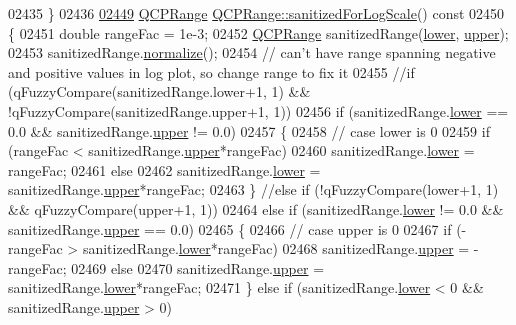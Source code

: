 \begin{DoxyCode}
02435 \}
02436 
\hypertarget{a00115_source_l02449}{}\hyperlink{a00049_aaf6a9046e78d91eeb8e89584fe46b034}{02449} \hyperlink{a00049}{QCPRange} \hyperlink{a00049_aaf6a9046e78d91eeb8e89584fe46b034}{QCPRange::sanitizedForLogScale}()\textcolor{keyword}{ const}
02450 \textcolor{keyword}{}\{
02451   \textcolor{keywordtype}{double} rangeFac = 1e-3;
02452   \hyperlink{a00049}{QCPRange} sanitizedRange(\hyperlink{a00049_aa3aca3edb14f7ca0c85d912647b91745}{lower}, \hyperlink{a00049_ae44eb3aafe1d0e2ed34b499b6d2e074f}{upper});
02453   sanitizedRange.\hyperlink{a00049_af914a7740269b0604d0827c634a878a9}{normalize}();
02454   \textcolor{comment}{// can't have range spanning negative and positive values in log plot, so change range to fix it}
02455   \textcolor{comment}{//if (qFuzzyCompare(sanitizedRange.lower+1, 1) && !qFuzzyCompare(sanitizedRange.upper+1, 1))}
02456   \textcolor{keywordflow}{if} (sanitizedRange.\hyperlink{a00049_aa3aca3edb14f7ca0c85d912647b91745}{lower} == 0.0 && sanitizedRange.\hyperlink{a00049_ae44eb3aafe1d0e2ed34b499b6d2e074f}{upper} != 0.0)
02457   \{
02458     \textcolor{comment}{// case lower is 0}
02459     \textcolor{keywordflow}{if} (rangeFac < sanitizedRange.\hyperlink{a00049_ae44eb3aafe1d0e2ed34b499b6d2e074f}{upper}*rangeFac)
02460       sanitizedRange.\hyperlink{a00049_aa3aca3edb14f7ca0c85d912647b91745}{lower} = rangeFac;
02461     \textcolor{keywordflow}{else}
02462       sanitizedRange.\hyperlink{a00049_aa3aca3edb14f7ca0c85d912647b91745}{lower} = sanitizedRange.\hyperlink{a00049_ae44eb3aafe1d0e2ed34b499b6d2e074f}{upper}*rangeFac;
02463   \} \textcolor{comment}{//else if (!qFuzzyCompare(lower+1, 1) && qFuzzyCompare(upper+1, 1))}
02464   \textcolor{keywordflow}{else} \textcolor{keywordflow}{if} (sanitizedRange.\hyperlink{a00049_aa3aca3edb14f7ca0c85d912647b91745}{lower} != 0.0 && sanitizedRange.\hyperlink{a00049_ae44eb3aafe1d0e2ed34b499b6d2e074f}{upper} == 0.0)
02465   \{
02466     \textcolor{comment}{// case upper is 0}
02467     \textcolor{keywordflow}{if} (-rangeFac > sanitizedRange.\hyperlink{a00049_aa3aca3edb14f7ca0c85d912647b91745}{lower}*rangeFac)
02468       sanitizedRange.\hyperlink{a00049_ae44eb3aafe1d0e2ed34b499b6d2e074f}{upper} = -rangeFac;
02469     \textcolor{keywordflow}{else}
02470       sanitizedRange.\hyperlink{a00049_ae44eb3aafe1d0e2ed34b499b6d2e074f}{upper} = sanitizedRange.\hyperlink{a00049_aa3aca3edb14f7ca0c85d912647b91745}{lower}*rangeFac;
02471   \} \textcolor{keywordflow}{else} \textcolor{keywordflow}{if} (sanitizedRange.\hyperlink{a00049_aa3aca3edb14f7ca0c85d912647b91745}{lower} < 0 && sanitizedRange.\hyperlink{a00049_ae44eb3aafe1d0e2ed34b499b6d2e074f}{upper} > 0)

\end{DoxyCode}
